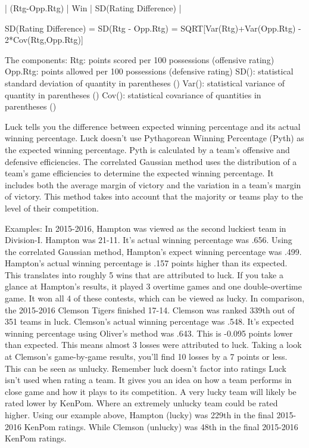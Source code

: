 \documentclass[
10pt, %
a4paper, %
oneside, %
headinclude,footinclude, %
BCOR5mm, %
]{scrartcl}
\begin{document}
\begin{description}
\begin{description}
            |           (Rtg-Opp.Rtg)           |
Win%
            |       SD(Rating Difference)       |

SD(Rating Difference) = SD(Rtg - Opp.Rtg)
= SQRT[Var(Rtg)+Var(Opp.Rtg) - 2*Cov(Rtg,Opp.Rtg)]

The components:
Rtg: points scored per 100 possessions (offensive rating)
Opp.Rtg: points allowed per 100 possessions (defensive rating)
SD(): statistical standard deviation of quantity in parentheses ()
Var(): statistical variance of quantity in parentheses ()
Cov(): statistical covariance of quantities in parentheses ()

Luck tells you the difference between expected winning percentage and its actual winning percentage.
Luck doesn't use Pythagorean Winning Percentage (Pyth) as the expected winning percentage. Pyth is calculated by a team's offensive and defensive efficiencies.
The correlated Gaussian method uses the distribution of a team's game efficiencies to determine the expected winning percentage. It includes both the average margin of victory and the variation in a team's margin of victory.
This method takes into account that the majority or teams play to the level of their competition.

Examples:
In 2015-2016, Hampton was viewed as the second luckiest team in Division-I.
Hampton was 21-11. It's actual winning percentage was .656.
Using the correlated Gaussian method, Hampton's expect winning percentage was .499.
Hampton's actual winning percentage is .157 points higher than its expected. This translates into roughly 5 wins that are attributed to luck.
If you take a glance at Hampton's results, it played 3 overtime games and one double-overtime game. It won all 4 of these contests, which can be viewed as lucky.
In comparison, the 2015-2016 Clemson Tigers finished 17-14. Clemson was ranked 339th out of 351 teams in luck.
Clemson's actual winning percentage was .548.
It's expected winning percentage using Oliver's method was .643.
This is -0.095 points lower than expected. This means almost 3 losses were attributed to luck.
Taking a look at Clemson's game-by-game results, you'll find 10 losses by a 7 points or less. This can be seen as unlucky.
Remember luck doesn't factor into ratings 
Luck isn't used when rating a team. It gives you an idea on how a team performs in close game and how it plays to its competition.
A very lucky team will likely be rated lower by KenPom.
Where an extremely unlucky team could be rated higher.
Using our example above, Hampton (lucky) was 229th in the final 2015-2016 KenPom ratings.
While Clemson (unlucky) was 48th in the final 2015-2016 KenPom ratings.


\end{description}
\end{description}
\end{document}
